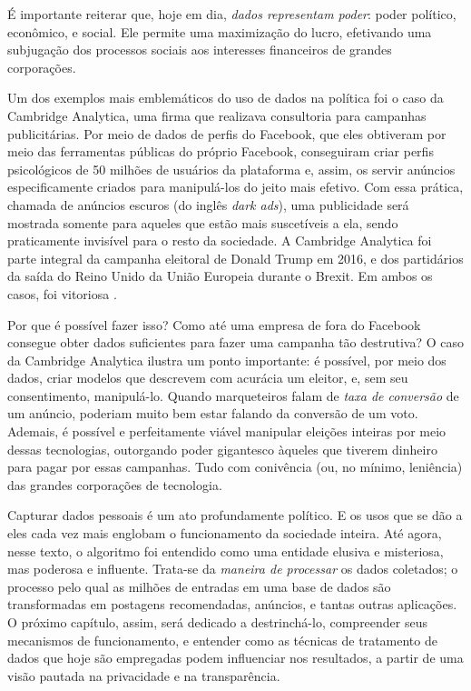 É importante reiterar que, hoje em dia, \textit{dados representam poder}: poder político, econômico, e social.
Ele permite uma maximização do lucro, efetivando uma subjugação dos processos sociais aos interesses financeiros de grandes corporações.

Um dos exemplos mais emblemáticos do uso de dados na política foi o caso da Cambridge Analytica, uma firma que realizava consultoria para campanhas publicitárias.
Por meio de dados de perfis do Facebook, que eles obtiveram por meio das ferramentas públicas do próprio Facebook, conseguiram criar perfis psicológicos de 50 milhões de usuários da plataforma e, assim, os servir anúncios especificamente criados para manipulá-los do jeito mais efetivo.
Com essa prática, chamada de anúncios escuros (do inglês \textit{dark ads}), uma publicidade será mostrada somente para aqueles que estão mais suscetíveis a ela, sendo praticamente invisível para o resto da sociedade.
A Cambridge Analytica foi parte integral da campanha eleitoral de Donald Trump em 2016, e dos partidários da saída do Reino Unido da União Europeia durante o Brexit.
Em ambos os casos, foi vitoriosa \cite{cadwalladr_50_2018}.

Por que é possível fazer isso?
Como até uma empresa de fora do Facebook consegue obter dados suficientes para fazer uma campanha tão destrutiva?
O caso da Cambridge Analytica ilustra um ponto importante:  é possível, por meio dos dados, criar modelos que descrevem com acurácia um eleitor, e, sem seu consentimento, manipulá-lo.
Quando marqueteiros falam de \textit{taxa de conversão} de um anúncio, poderiam muito bem estar falando da conversão de um voto.
Ademais, é possível e perfeitamente viável manipular eleições inteiras por meio dessas tecnologias, outorgando poder gigantesco àqueles que tiverem dinheiro para pagar por essas campanhas.
Tudo com conivência (ou, no mínimo, leniência) das grandes corporações de tecnologia.

Capturar dados pessoais é um ato profundamente político.
E os usos que se dão a eles cada vez mais englobam o funcionamento da sociedade inteira.
Até agora, nesse texto, o algoritmo foi entendido como uma entidade elusiva e misteriosa, mas poderosa e influente.
Trata-se da \textit{maneira de processar} os dados coletados; o processo pelo qual as milhões de entradas em uma base de dados são transformadas em postagens recomendadas, anúncios, e tantas outras aplicações.
O próximo capítulo, assim, será dedicado a destrinchá-lo, compreender seus mecanismos de funcionamento, e entender como as técnicas de tratamento de dados que hoje são empregadas podem influenciar nos resultados, a partir de uma visão pautada na privacidade e na transparência.
